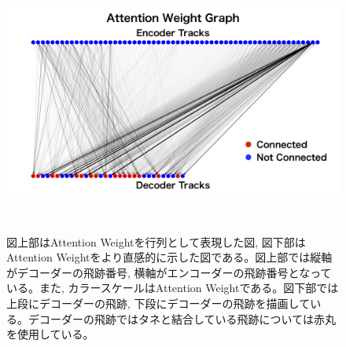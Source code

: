 \begin{figure}[htbp]
   \begin{minipage}{1.0\textwidth}
   \centering
    \includegraphics[trim = 100 0 100 0, width=1.0\textwidth, clip]{Figure/3Networks/3-4-3-3AttentionWeightGraph.png}
   \end{minipage}
  \caption[Attention Weight]{図上部はAttention Weightを行列として表現した図, 図下部はAttention Weightをより直感的に示した図である。図上部では縦軸がデコーダーの飛跡番号, 横軸がエンコーダーの飛跡番号となっている。また, カラースケールはAttention Weightである。図下部では上段にデコーダーの飛跡, 下段にデコーダーの飛跡を描画している。デコーダーの飛跡ではタネと結合している飛跡については赤丸を使用している。}
  \label{3-4-3-3AttentionWeight}
\end{figure}



























